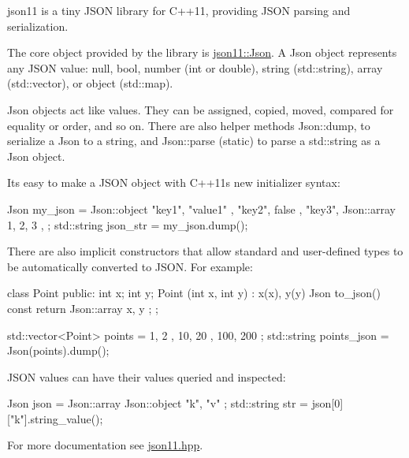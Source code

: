json11 is a tiny JSON library for C++11, providing JSON parsing and serialization.

The core object provided by the library is \mbox{\hyperlink{classjson11_1_1_json}{json11\+::\+Json}}. A Json object represents any JSON value\+: null, bool, number (int or double), string (std\+::string), array (std\+::vector), or object (std\+::map).

Json objects act like values. They can be assigned, copied, moved, compared for equality or order, and so on. There are also helper methods Json\+::dump, to serialize a Json to a string, and Json\+::parse (static) to parse a std\+::string as a Json object.

It\textquotesingle{}s easy to make a JSON object with C++11\textquotesingle{}s new initializer syntax\+: \begin{DoxyVerb}Json my_json = Json::object {
    { "key1", "value1" },
    { "key2", false },
    { "key3", Json::array { 1, 2, 3 } },
};
std::string json_str = my_json.dump();
\end{DoxyVerb}
 There are also implicit constructors that allow standard and user-\/defined types to be automatically converted to JSON. For example\+: \begin{DoxyVerb}class Point {
public:
    int x;
    int y;
    Point (int x, int y) : x(x), y(y) {}
    Json to_json() const { return Json::array { x, y }; }
};

std::vector<Point> points = { { 1, 2 }, { 10, 20 }, { 100, 200 } };
std::string points_json = Json(points).dump();
\end{DoxyVerb}
 JSON values can have their values queried and inspected\+: \begin{DoxyVerb}Json json = Json::array { Json::object { { "k", "v" } } };
std::string str = json[0]["k"].string_value();
\end{DoxyVerb}
 For more documentation see \mbox{\hyperlink{json11_8hpp_source}{json11.\+hpp}}. 